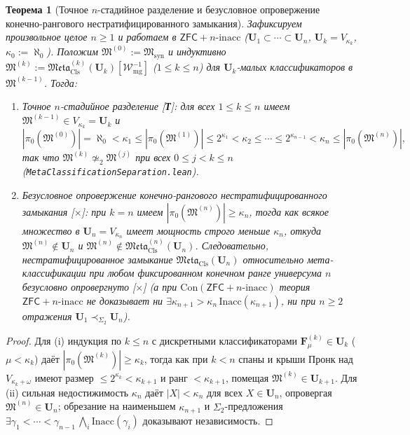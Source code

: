 \documentclass[11pt]{article}
\theoremstyle{plain}
\newtheorem{theorem}{Теорема}[section]
\theoremstyle{definition}
\newcommand{\fM}{\mathfrak{M}}
\newcommand{\Meta}{\mathfrak{Meta}}
\newcommand{\Con}{\mathrm{Con}}
\newcommand{\ZFC}{\mathsf{ZFC}}
\begin{document}
\begin{theorem}[Точное $n$-стадийное разделение и безусловное опровержение конечно-рангового нестратифицированного замыкания]\label{thm:b2-finite-rank-nogo}
Зафиксируем произвольное целое $n \ge 1$ и работаем в $\ZFC + n\text{-}\mathrm{inacc}$ ($\mathbf{U}_1 \subset \cdots \subset \mathbf{U}_n$, $\mathbf{U}_k = V_{\kappa_k}$, $\kappa_0 := \aleph_0$). Положим $\fM^{(0)} := \fM_{\mathrm{syn}}$ и индуктивно $\fM^{(k)} := \Meta_{\mathrm{Cls}}^{(k)}(\mathbf{U}_k)[\mathcal{W}_{\mathrm{mg}}^{-1}]$ ($1 \le k \le n$) для $\mathbf{U}_k$-малых классификаторов в $\fM^{(k-1)}$. Тогда:
\begin{enumerate}[nosep,label=(\roman*)]
\item \emph{Точное $n$-стадийное разделение \textup{[\textbf{Т}]}}: для всех $1 \le k \le n$ имеем $\fM^{(k-1)} \in V_{\kappa_k} = \mathbf{U}_k$ и
\[
  |\pi_0(\fM^{(0)})| = \aleph_0 < \kappa_1 \le |\pi_0(\fM^{(1)})| \le 2^{\kappa_1} < \kappa_2 \le \cdots \le 2^{\kappa_{n-1}} < \kappa_n \le |\pi_0(\fM^{(n)})|,
\]
так что $\fM^{(k)} \not\simeq_2 \fM^{(j)}$ при всех $0 \le j < k \le n$ (\texttt{MetaClassificationSeparation.lean}).
\item \emph{Безусловное опровержение конечно-рангового нестратифицированного замыкания \textup{[\textbf{$\times$}]}}: при $k = n$ имеем $|\pi_0(\fM^{(n)})| \ge \kappa_n$, тогда как всякое множество в $\mathbf{U}_n = V_{\kappa_n}$ имеет мощность строго меньше $\kappa_n$, откуда $\fM^{(n)} \notin \mathbf{U}_n$ и $\fM^{(n)} \notin \Meta_{\mathrm{Cls}}^{(n)}(\mathbf{U}_n)$. Следовательно, нестратифицированное замыкание $\Meta_{\mathrm{Cls}}(\mathbf{U}_n)$ относительно мета-классификации при любом фиксированном конечном ранге универсума $n$ безусловно опровергнуто \textup{[\textbf{$\times$}]} (а при $\Con(\ZFC + n\text{-}\mathrm{inacc})$ теория $\ZFC + n\text{-}\mathrm{inacc}$ не доказывает ни $\exists\kappa_{n+1} > \kappa_n\,\mathrm{Inacc}(\kappa_{n+1})$, ни при $n \ge 2$ отражения $\mathbf{U}_1 \prec_{\Sigma_2} \mathbf{U}_n$).
\end{enumerate}
\end{theorem}
\begin{proof}
Для (i) индукция по $k \le n$ с дискретными классификаторами $\mathbf{F}_\mu^{(k)} \in \mathbf{U}_k$ ($\mu < \kappa_k$) даёт $|\pi_0(\fM^{(k)})| \ge \kappa_k$, тогда как при $k < n$ спаны и крыши Пронк над $V_{\kappa_k + \omega}$ имеют размер $\le 2^{\kappa_k} < \kappa_{k+1}$ и ранг $< \kappa_{k+1}$, помещая $\fM^{(k)} \in \mathbf{U}_{k+1}$. Для (ii) сильная недостижимость $\kappa_n$ даёт $|X| < \kappa_n$ для всех $X \in \mathbf{U}_n$, опровергая $\fM^{(n)} \in \mathbf{U}_n$; обрезание на наименьшем $\kappa_{n+1}$ и $\Sigma_2$-предложения $\exists \gamma_1 < \cdots < \gamma_{n-1}\,\bigwedge_i \mathrm{Inacc}(\gamma_i)$ доказывают независимость.
\end{proof}
\end{document}
